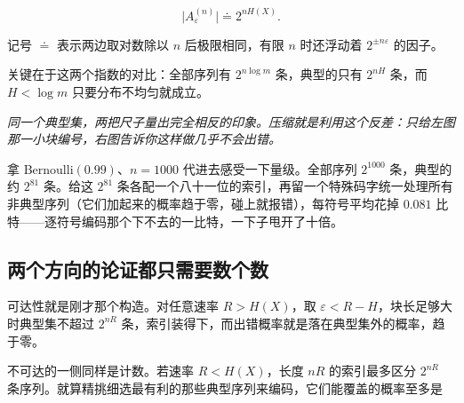 \[
\bigl|A_\varepsilon^{(n)}\bigr|\doteq 2^{nH(X)}.
\]

记号 \(\doteq\) 表示两边取对数除以 \(n\) 后极限相同，有限 \(n\) 时还浮动着 \(2^{\pm n\varepsilon}\) 的因子。

关键在于这两个指数的对比：全部序列有 \(2^{n\log m}\) 条，典型的只有 \(2^{nH}\) 条，而 \(H<\log m\) 只要分布不均匀就成立。

\begin{center}

\emph{同一个典型集，两把尺子量出完全相反的印象。压缩就是利用这个反差：只给左图那一小块编号，右图告诉你这样做几乎不会出错。}
\end{center}

拿 Bernoulli\((0.99)\)、\(n=1000\) 代进去感受一下量级。全部序列 \(2^{1000}\) 条，典型的约 \(2^{81}\) 条。给这 \(2^{81}\) 条各配一个八十一位的索引，再留一个特殊码字统一处理所有非典型序列（它们加起来的概率趋于零，碰上就报错），每符号平均花掉 \(0.081\) 比特——逐符号编码那个下不去的一比特，一下子甩开了十倍。

\subsection{两个方向的论证都只需要数个数}

可达性就是刚才那个构造。对任意速率 \(R>H(X)\)，取 \(\varepsilon<R-H\)，块长足够大时典型集不超过 \(2^{nR}\) 条，索引装得下，而出错概率就是落在典型集外的概率，趋于零。

不可达的一侧同样是计数。若速率 \(R<H(X)\)，长度 \(nR\) 的索引最多区分 \(2^{nR}\) 条序列。就算精挑细选最有利的那些典型序列来编码，它们能覆盖的概率至多是

